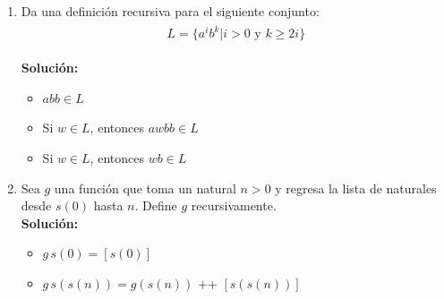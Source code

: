 \documentclass[11pt,letterpaper]{article}
\begin{document}
\begin{enumerate}

    \item Da una definición recursiva para el siguiente conjunto: \\
        \begin{equation*} \begin{split} \begin{gathered}
            L = \{a^i b^k | i > 0 \text{ y } k \geq 2i\}
        \end{gathered} \end{split} \end{equation*}

        \textbf{Solución:}
        \begin{itemize}
            \item $abb \in L$
            \item Si $w \in L$, entonces $awbb \in L$
            \item Si $w \in L$, entonces $wb \in L$
        \end{itemize}

    \item Sea $g$ una función que toma un natural $n > 0$ y regresa la lista de naturales
    desde $s(0)$ hasta $n$. Define $g$ recursivamente. \\

        \textbf{Solución:}
        \begin{itemize}
            \item $g\,  s(0) = [s(0)]$
            \item $g\,  s(s(n)) = g(s(n)) $ ++ $[s(s(n))]$
        \end{itemize}


\end{enumerate}
\end{document}
